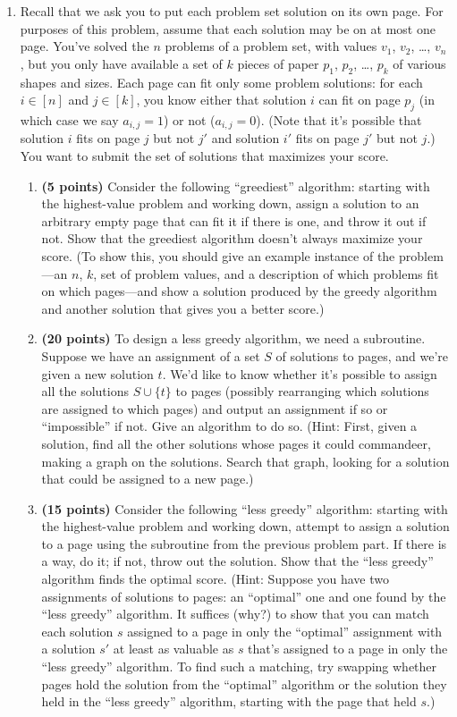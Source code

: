 \documentclass[10pt]{article}
\begin{document}
\begin{enumerate}
\item 
Recall that we ask you to put each problem set solution on its own page.
For purposes of this problem, assume that each solution may be on at most one page.
You've solved the $n$ problems of a problem set, with values $v_1$, $v_2$, \ldots, $v_n$,
but you only have available a set of $k$ pieces of paper $p_1$, $p_2$, \ldots, $p_k$ of various shapes and sizes.
Each page can fit only some problem solutions: for each $i \in [n]$ and $j \in [k]$,
you know either that solution $i$ can fit on page $p_j$ (in which case we say $a_{i,j} = 1$) or not ($a_{i,j} = 0$).
(Note that it's possible that solution $i$ fits on page $j$ but not $j'$ and solution $i'$ fits on page $j'$ but not $j$.)
You want to submit the set of solutions that maximizes your score.
\begin{enumerate}
\item
{\bf (5 points)}
Consider the following ``greediest'' algorithm: starting with the highest-value problem and working down,
assign a solution to an arbitrary empty page that can fit it if there is one, and throw it out if not.
Show that the greediest algorithm doesn't always maximize your score.
(To show this, you should give an example instance of the problem---an $n$, $k$, set 
of problem values, and a description 
of which problems fit on which pages---and show
a solution produced by the greedy algorithm and another solution that gives you a better score.)
\item
{\bf (20 points)}
To design a less greedy algorithm, we need a subroutine. 
Suppose we have an assignment of a set $S$ of solutions to pages,
and we're given a new solution $t$. We'd like to know whether it's
possible to assign all the solutions $S \cup \{t\}$ to pages (possibly rearranging which solutions
are assigned to which pages) and output an assignment if so or ``impossible'' if not.
Give an algorithm to do so. 
(Hint: First, given a solution, find all the other solutions whose pages it could commandeer, making a graph on the solutions.
Search that graph, looking for a solution that could be assigned to a new page.)
\item
{\bf (15 points)}
Consider the following ``less greedy'' algorithm: starting with the highest-value problem and working down,
attempt to assign a solution to a page using the subroutine from the previous problem part. 
If there is a way, do it; if not, throw out the solution.
Show that the ``less greedy'' algorithm finds the optimal score.
(Hint: Suppose you have two assignments of solutions to pages: an ``optimal'' one and one found by the ``less greedy'' algorithm. It suffices (why?) to show that you can match each solution $s$ assigned to a page in only the ``optimal'' assignment with a solution $s'$ at least as valuable as $s$ that's assigned to a page in only the ``less greedy'' algorithm. To find such a matching, try swapping whether pages hold the solution from the ``optimal'' algorithm or the solution they held in the ``less greedy'' algorithm, starting with the page that held $s$.)
\end{enumerate}


\end{enumerate}
\end{document}
